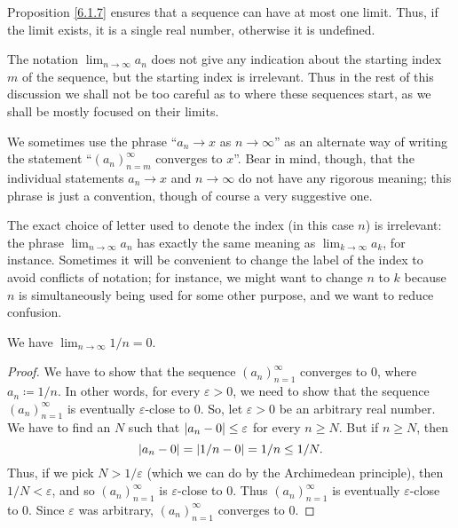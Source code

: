 \begin{note}
    Proposition \ref{6.1.7} ensures that a sequence can have at most one limit.
    Thus, if the limit exists, it is a single real number, otherwise it is undefined.
\end{note}

\begin{remark}\label{6.1.9}
    The notation \(\lim_{n \to \infty} a_n\) does not give any indication about the starting index \(m\) of the sequence, but the starting index is irrelevant.
    Thus in the rest of this discussion we shall not be too careful as to where these sequences start, as we shall be mostly focused on their limits.
\end{remark}

\begin{note}
    We sometimes use the phrase ``\(a_n \to x\) as \(n \to \infty\)'' as an alternate way of writing the statement ``\((a_n)_{n = m}^\infty\) converges to \(x\)''.
    Bear in mind, though, that the individual statements \(a_n \to x\) and \(n \to \infty\) do not have any rigorous meaning;
    this phrase is just a convention, though of course a very suggestive one.
\end{note}

\begin{remark}\label{6.1.10}
    The exact choice of letter used to denote the index (in this case \(n\)) is irrelevant:
    the phrase \(\lim_{n \to \infty} a_n\) has exactly the same meaning as \(\lim_{k \to \infty} a_k\), for instance.
    Sometimes it will be convenient to change the label of the index to avoid conflicts of notation;
    for instance, we might want to change \(n\) to \(k\) because \(n\) is simultaneously being used for some other purpose, and we want to reduce confusion.
\end{remark}

\begin{proposition}\label{6.1.11}
    We have \(\lim_{n \to \infty} 1 / n = 0\).
\end{proposition}

\begin{proof}
    We have to show that the sequence \((a_n)_{n = 1}^\infty\) converges to \(0\), where \(a_n \coloneqq 1 / n\).
    In other words, for every \(\varepsilon > 0\), we need to show that the sequence \((a_n)_{n = 1}^\infty\) is eventually \(\varepsilon\)-close to \(0\).
    So, let \(\varepsilon > 0\) be an arbitrary real number.
    We have to find an \(N\) such that \(\left\lvert a_n - 0\right\rvert \leq \varepsilon\) for every \(n \geq N\).
    But if \(n \geq N\), then
    \[
        \left\lvert a_n - 0\right\rvert = \left\lvert1 / n - 0\right\rvert = 1 / n \leq 1 / N.
    \]
    Thus, if we pick \(N > 1 / \varepsilon\) (which we can do by the Archimedean principle), then \(1 / N < \varepsilon\), and so \((a_n)_{n = 1}^\infty\) is \(\varepsilon\)-close to \(0\).
    Thus \((a_n)_{n = 1}^\infty\) is eventually \(\varepsilon\)-close to \(0\).
    Since \(\varepsilon\) was arbitrary, \((a_n)_{n = 1}^\infty\) converges to \(0\).
\end{proof}

